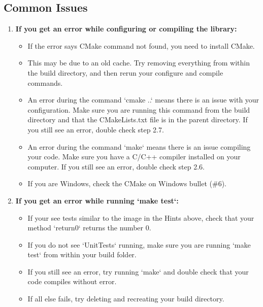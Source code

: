 \documentclass{article} %
\begin{document}
\subsection*{Common Issues}
\begin{enumerate}
    \item \textbf{If you get an error while configuring or compiling the library:}
    \begin{itemize}
        \item If the error says CMake command not found, you need to install CMake.
        \item This may be due to an old cache.  Try removing everything from within the build directory, and then rerun your configure and compile commands.
        \item An error during the command `cmake ..` means there is an issue with your configuration.  Make sure you are running this command from the build directory and that the CMakeLists.txt file is in the parent directory.  If you still see an error, double check step 2.7.
        \item An error during the command `make` means there is an issue compiling your code.  Make sure you have a C/C++ compiler installed on your computer.  If you still see an error, double check step 2.6.
        \item If you are Windows, check the CMake on Windows bullet (\#6).
    \end{itemize}

    \item \textbf{If you get an error while running `make test`:}
    \begin{itemize}
        \item If your see tests similar to the image in the Hints above, check that your method `return0` returns the number 0.
        \item If you do not see `UnitTests` running, make sure you are running `make test` from within your build folder.
        \item If you still see an error, try running `make` and double check that your code compiles without error.
        \item If all else fails, try deleting and recreating your build directory.
    \end{itemize}


\end{enumerate}
\end{document}
